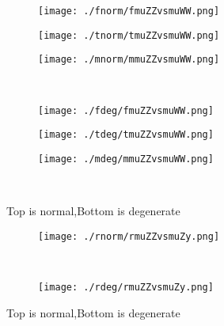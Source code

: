 \documentclass[aps,floats,floatfix,nofootinbib]{revtex4-1}
\begin{document}
\begin{center}
\begin{figure}
\begin{subfigure}{0.3\textwidth}
\texttt{[image: ./fnorm/fmuZZvsmuWW.png]}
\label{}
\end{subfigure}
\begin{subfigure}{0.3\textwidth}
\texttt{[image: ./tnorm/tmuZZvsmuWW.png]}
\label{}
\end{subfigure}
\begin{subfigure}{0.3\textwidth}
\texttt{[image: ./mnorm/mmuZZvsmuWW.png]}
\label{}
\end{subfigure}\\
\begin{subfigure}{0.3\textwidth}
\texttt{[image: ./fdeg/fmuZZvsmuWW.png]}
\label{}
\end{subfigure}
\begin{subfigure}{0.3\textwidth}
\texttt{[image: ./tdeg/tmuZZvsmuWW.png]}
\label{}
\end{subfigure}
\begin{subfigure}{0.3\textwidth}
\texttt{[image: ./mdeg/mmuZZvsmuWW.png]}
\label{}
\end{subfigure}\\
\caption{Top is normal,Bottom is degenerate}
\end{figure}
\end{center}

\begin{center}
\begin{figure}
\begin{subfigure}{0.95\textwidth}
\texttt{[image: ./rnorm/rmuZZvsmuZy.png]}
\label{}
\end{subfigure}\\
\begin{subfigure}{0.95\textwidth}
\texttt{[image: ./rdeg/rmuZZvsmuZy.png]}
\label{}
\end{subfigure}
\caption{Top is normal,Bottom is degenerate}
\end{figure}
\end{center}
\end{document}

